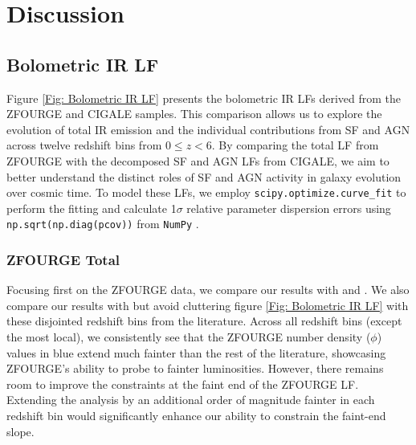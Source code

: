 \section{Discussion} \label{Sec: Discussion}
\subsection{Bolometric IR LF} \label{Sec: Bolometric IR LF}

Figure \ref{Fig: Bolometric IR LF} presents the bolometric IR LFs derived from the ZFOURGE and CIGALE samples. This comparison allows us to explore the evolution of total IR emission and the individual contributions from SF and AGN across twelve redshift bins from $0 \leq z < 6$. By comparing the total LF from ZFOURGE with the decomposed SF and AGN LFs from CIGALE, we aim to better understand the distinct roles of SF and AGN activity in galaxy evolution over cosmic time. To model these LFs, we employ \texttt{scipy.optimize.curve\_fit} \citep{virtanen_scipy_2020} to perform the fitting and calculate 1$\sigma$ relative parameter dispersion errors using \texttt{np.sqrt(np.diag(pcov))} from \texttt{NumPy} \citep{harris_array_2020}. 

\subsubsection{ZFOURGE Total}
Focusing first on the ZFOURGE data, we compare our results with \cite{rodighiero_mid-_2010} and \cite{gruppioni_herschel_2013}. We also compare our results with \cite{huang_local_2007, caputi_infrared_2007, fu_decomposing_2010} but avoid cluttering figure \ref{Fig: Bolometric IR LF} with these disjointed redshift bins from the literature. Across all redshift bins (except the most local), we consistently see that the ZFOURGE number density ($\phi$) values in blue extend much fainter than the rest of the literature, showcasing ZFOURGE's ability to probe to fainter luminosities. However, there remains room to improve the constraints at the faint end of the ZFOURGE LF. Extending the analysis by an additional order of magnitude fainter in each redshift bin would significantly enhance our ability to constrain the faint-end slope.


